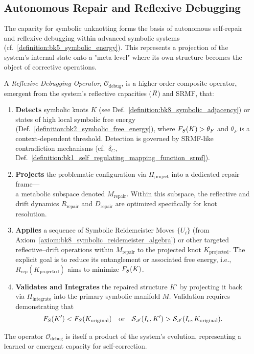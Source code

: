 \subsection{Autonomous Repair and Reflexive Debugging}
\label{subsec:bk8_observer_relative_geometry}
The capacity for symbolic unknotting forms the basis of autonomous self-repair and reflexive debugging within advanced symbolic systems (cf.~\ref{definition:bk5_symbolic_energy}). This represents a projection of the system's internal state onto a "meta-level" where its own structure becomes the object of corrective operations.
\begin{definition}
\label{definition:bk8_symbolic_stress_tensor}
A \emph{Reflexive Debugging Operator}, $\mathcal{O}_{\text{debug}}$, is a higher-order composite operator, emergent from the system's reflective capacities ($R$) and SRMF, that:
\begin{enumerate}
  \item \textbf{Detects} symbolic knots \( K \) (see Def.~\ref{definition:bk8_symbolic_adjacency}) or
  states of high local symbolic free energy (Def.~\ref{definition:bk2_symbolic_free_energy}),
  where \( F_S(K) > \theta_F \) and \( \theta_F \) is a context-dependent threshold.
  Detection is governed by SRMF-like contradiction mechanisms (cf.~\( \delta_C \), Def.~\ref{definition:bk1_self_regulating_mapping_function_srmf}).
  \item \textbf{Projects} the problematic configuration via 
  \( \Pi_{\text{project}} \) into a dedicated repair frame— \\
  \hspace*{1.5em}a metabolic subspace denoted \( M_{\text{repair}} \).
  Within this subspace, the reflective and drift dynamics 
  \( R_{\text{repair}} \) and \( D_{\text{repair}} \) 
  are optimized specifically for knot resolution.
  \item \textbf{Applies} a sequence of Symbolic Reidemeister Moves 
  \( \{U_i\} \) (from Axiom~\ref{axiom:bk8_symbolic_reidemeister_algebra})
  or other targeted reflective–drift operations within \( M_{\text{repair}} \) 
  to the projected knot \( K_{\text{projected}} \). 
  The explicit goal is to reduce its entanglement or associated free energy, i.e.,
  \( R_{\text{rep}}(K_{\text{projected}}) \) aims to minimize \( F_S(K) \).
  \item \textbf{Validates and Integrates} the repaired structure \( K' \) by projecting it back 
  via \( \Pi_{\text{integrate}} \) into the primary symbolic manifold \( M \). 
  Validation requires demonstrating that
  \[
    F_S(K') < F_S(K_{\text{original}}) 
    \quad \text{or} \quad 
    \mathcal{S}_{\mathscr{I}}(I_c, K') > \mathcal{S}_{\mathscr{I}}(I_c, K_{\text{original}}).
  \]
\end{enumerate}
The operator $\mathcal{O}_{\text{debug}}$ is itself a product of the system's evolution, representing a learned or emergent capacity for self-correction.
\end{definition}
